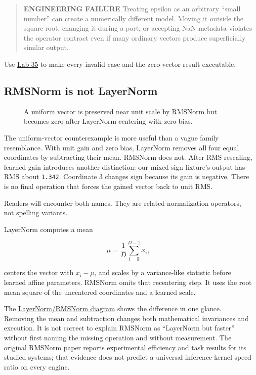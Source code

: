 \documentclass[
  10pt,
]{article}
\begin{document}
\begin{quote}
\textbf{ENGINEERING FAILURE} Treating epsilon as an arbitrary ``small
number'' can create a numerically different model. Moving it outside the
square root, changing it during a port, or accepting NaN metadata
violates the operator contract even if many ordinary vectors produce
superficially similar output.
\end{quote}

Use
\href{https://github.com/hermonai/inside-the-llm-engine/blob/astra-visual-rewrite/labs/lab-35-break-epsilon.md}{Lab
35} to make every invalid case and the zero-vector result executable.

\subsection{RMSNorm is not LayerNorm}\label{rmsnorm-is-not-layernorm}

\begin{figure}[H]\centering\resizebox{\linewidth}{!}{}\caption{A uniform vector is preserved near unit scale by RMSNorm but becomes zero after LayerNorm centering with zero bias.}\end{figure}

The uniform-vector counterexample is more useful than a vague family
resemblance. With unit gain and zero bias, LayerNorm removes all four
equal coordinates by subtracting their mean. RMSNorm does not. After RMS
rescaling, learned gain introduces another distinction: our mixed-sign
fixture's output has RMS about \texttt{1.342}. Coordinate 3 changes sign
because its gain is negative. There is no final operation that forces
the gained vector back to unit RMS.

Readers will encounter both names. They are related normalization
operators, not spelling variants.

LayerNorm computes a mean

\[
\mu=\frac{1}{D}\sum_{i=0}^{D-1}x_i,
\]

centers the vector with \(x_i-\mu\), and scales by a variance-like
statistic before learned affine parameters. RMSNorm omits that
recentering step. It uses the root mean square of the uncentered
coordinates and a learned scale.

The
\href{https://github.com/hermonai/inside-the-llm-engine/blob/astra-visual-rewrite/diagrams/transformer/layernorm-vs-rmsnorm.txt}{LayerNorm/RMSNorm
diagram} shows the difference in one glance. Removing the mean and
subtraction changes both mathematical invariances and execution. It is
not correct to explain RMSNorm as ``LayerNorm but faster'' without first
naming the missing operation and without measurement. The original
RMSNorm paper reports experimental efficiency and task results for its
studied systems; that evidence does not predict a universal
inference-kernel speed ratio on every engine.
\end{document}

